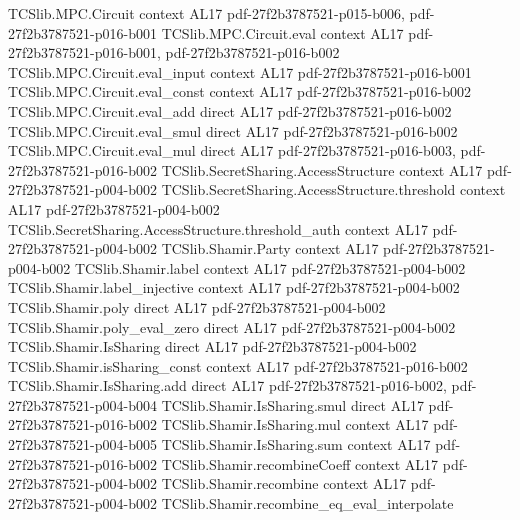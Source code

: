 \begin{theorem}
\label{TCSlib.MPC.BGW.bgwEval_recombine}
\leanok
\proofstep
  {TCSlib.MPC.Circuit}
  {context}
  {AL17}
  {pdf-27f2b3787521-p015-b006,
    pdf-27f2b3787521-p016-b001}
\proofstep
  {TCSlib.MPC.Circuit.eval}
  {context}
  {AL17}
  {pdf-27f2b3787521-p016-b001,
    pdf-27f2b3787521-p016-b002}
\proofstep
  {TCSlib.MPC.Circuit.eval_input}
  {context}
  {AL17}
  {pdf-27f2b3787521-p016-b001}
\proofstep
  {TCSlib.MPC.Circuit.eval_const}
  {context}
  {AL17}
  {pdf-27f2b3787521-p016-b002}
\proofstep
  {TCSlib.MPC.Circuit.eval_add}
  {direct}
  {AL17}
  {pdf-27f2b3787521-p016-b002}
\proofstep
  {TCSlib.MPC.Circuit.eval_smul}
  {direct}
  {AL17}
  {pdf-27f2b3787521-p016-b002}
\proofstep
  {TCSlib.MPC.Circuit.eval_mul}
  {direct}
  {AL17}
  {pdf-27f2b3787521-p016-b003,
    pdf-27f2b3787521-p016-b002}
\proofstep
  {TCSlib.SecretSharing.AccessStructure}
  {context}
  {AL17}
  {pdf-27f2b3787521-p004-b002}
\proofstep
  {TCSlib.SecretSharing.AccessStructure.threshold}
  {context}
  {AL17}
  {pdf-27f2b3787521-p004-b002}
\proofstep
  {TCSlib.SecretSharing.AccessStructure.threshold_auth}
  {context}
  {AL17}
  {pdf-27f2b3787521-p004-b002}
\proofstep
  {TCSlib.Shamir.Party}
  {context}
  {AL17}
  {pdf-27f2b3787521-p004-b002}
\proofstep
  {TCSlib.Shamir.label}
  {context}
  {AL17}
  {pdf-27f2b3787521-p004-b002}
\proofstep
  {TCSlib.Shamir.label_injective}
  {context}
  {AL17}
  {pdf-27f2b3787521-p004-b002}
\proofstep
  {TCSlib.Shamir.poly}
  {direct}
  {AL17}
  {pdf-27f2b3787521-p004-b002}
\proofstep
  {TCSlib.Shamir.poly_eval_zero}
  {direct}
  {AL17}
  {pdf-27f2b3787521-p004-b002}
\proofstep
  {TCSlib.Shamir.IsSharing}
  {direct}
  {AL17}
  {pdf-27f2b3787521-p004-b002}
\proofstep
  {TCSlib.Shamir.isSharing_const}
  {context}
  {AL17}
  {pdf-27f2b3787521-p016-b002}
\proofstep
  {TCSlib.Shamir.IsSharing.add}
  {direct}
  {AL17}
  {pdf-27f2b3787521-p016-b002,
    pdf-27f2b3787521-p004-b004}
\proofstep
  {TCSlib.Shamir.IsSharing.smul}
  {direct}
  {AL17}
  {pdf-27f2b3787521-p016-b002}
\proofstep
  {TCSlib.Shamir.IsSharing.mul}
  {context}
  {AL17}
  {pdf-27f2b3787521-p004-b005}
\proofstep
  {TCSlib.Shamir.IsSharing.sum}
  {context}
  {AL17}
  {pdf-27f2b3787521-p016-b002}
\proofstep
  {TCSlib.Shamir.recombineCoeff}
  {context}
  {AL17}
  {pdf-27f2b3787521-p004-b002}
\proofstep
  {TCSlib.Shamir.recombine}
  {context}
  {AL17}
  {pdf-27f2b3787521-p004-b002}
\proofstep
  {TCSlib.Shamir.recombine_eq_eval_interpolate}

\end{theorem}
